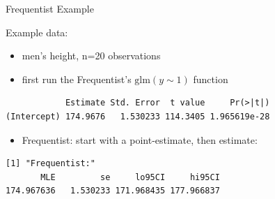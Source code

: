 \documentclass[presentation]{beamer}
\begin{document}
\begin{frame}[fragile,label=sec-8]{Frequentist Example}
 \begin{block}{Example data:}
\begin{itemize}
\item men's height, n=20 observations
\item first run the Frequentist's $\text{glm}(y\sim1)$ function
\end{itemize}
\color{blue}
\begin{verbatim}
            Estimate Std. Error  t value     Pr(>|t|)
(Intercept) 174.9676   1.530233 114.3405 1.965619e-28
\end{verbatim}

\color{black}
\begin{itemize}
\item Frequentist: start with a point-estimate, then estimate:
\end{itemize}
\color{blue}
\begin{verbatim}
[1] "Frequentist:"
       MLE         se     lo95CI     hi95CI 
174.967636   1.530233 171.968435 177.966837
\end{verbatim}

\color{black}
\end{block}
\end{frame}
\end{document}
